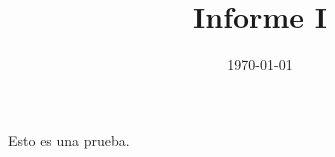 \documentclass[]{article}
\title{Informe I}
\author{}
\date{\today}
\begin{document}
\maketitle  


\tableofcontents
Esto es una prueba.











\end{document}
